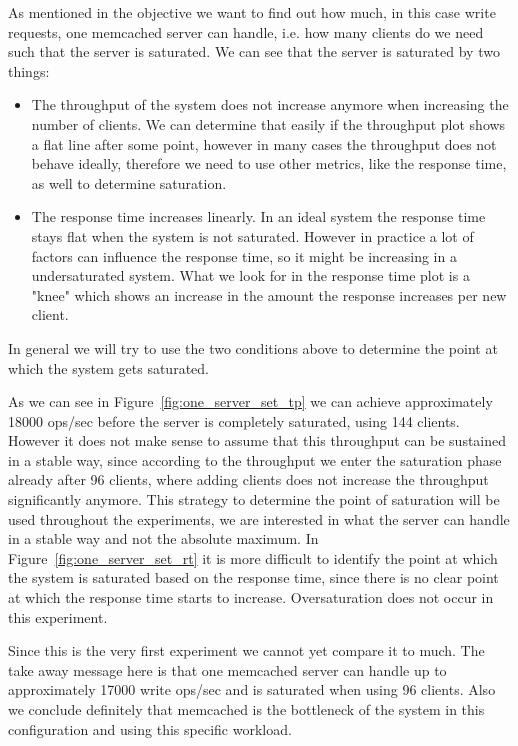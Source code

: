 \documentclass[11pt,a4paper]{article}
\begin{document}
%
As mentioned in the objective we want to find out how much, in this case write requests, one memcached server can handle, i.e. how many clients do we need such that the server is saturated.
%
We can see that the server is saturated by two things:
%
\begin{itemize}
	\item The throughput of the system does not increase anymore when increasing the number of clients. We can determine that easily if the throughput plot shows a flat line after some point, however in many cases the throughput does not behave ideally, therefore we need to use other metrics, like the response time, as well to determine saturation.
	\item The response time increases linearly. In an ideal system the response time stays flat when the system is not saturated. However in practice a lot of factors can influence the response time, so it might be increasing in a undersaturated system. What we look for in the response time plot is a "knee" which shows an increase in the amount the response increases per new client. 
\end{itemize}
%
In general we will try to use the two conditions above to determine the point at which the system gets saturated.
%
\par
%
As we can see in Figure~\ref{fig:one_server_set_tp} we can achieve approximately 18000 ops/sec before the server is completely saturated, using 144 clients.
%
However it does not make sense to assume that this throughput can be sustained in a stable way, since according to the throughput we enter the saturation phase already after 96 clients, where adding clients does not increase the throughput significantly anymore.
%
This strategy to determine the point of saturation will be used throughout the experiments, we are interested in what the server can handle in a stable way and not the absolute maximum.
%
In Figure~\ref{fig:one_server_set_rt} it is more difficult to identify the point at which the system is saturated based on the response time, since there is no clear point at which the response time starts to increase.
%
Oversaturation does not occur in this experiment.
%
\par
%
Since this is the very first experiment we cannot yet compare it to much.
%
The take away message here is that one memcached server can handle up to approximately 17000 write ops/sec and is saturated when using 96 clients.
%
Also we conclude definitely that memcached is the bottleneck of the system in this configuration and using this specific workload.
%
\end{document}
